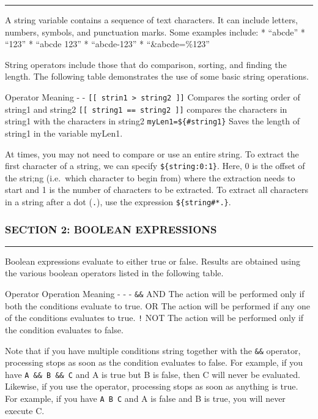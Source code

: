 \begin{center}\rule{3in}{0.4pt}\end{center}

A string variable contains a sequence of text characters. It can include
letters, numbers, symbols, and punctuation marks. Some examples include:
* ``abcde'' * ``123'' * ``abcde 123'' * ``abcde-123'' *
``\&abcde=\%123''

String operators include those that do comparison, sorting, and finding
the length. The following table demonstrates the use of some basic
string operations.

Operator \textbar{} Meaning - \textbar{} -
\texttt{{[}{[} strin1 \textgreater{} string2 {]}{]}} \textbar{} Compares
the sorting order of string1 and string2
\texttt{{[}{[} string1 == string2 {]}{]}} \textbar{} compares the
characters in string1 with the characters in string2
\texttt{myLen1=\$\{\#string1\}} \textbar{} Saves the length of string1
in the variable myLen1.

At times, you may not need to compare or use an entire string. To
extract the first character of a string, we can specify
\texttt{\$\{string:0:1\}}. Here, 0 is the offset of the stri;ng
(i.e.~which character to begin from) where the extraction needs to start
and 1 is the number of characters to be extracted. To extract all
characters in a string after a dot (\texttt{.}), use the expression
\texttt{\$\{string\#*.\}}.

\subsubsection{SECTION 2: BOOLEAN
EXPRESSIONS}\label{section-2-boolean-expressions}

\begin{center}\rule{3in}{0.4pt}\end{center}

Boolean expressions evaluate to either true or false. Results are
obtained using the various boolean operators listed in the following
table.

Operator \textbar{} Operation \textbar{} Meaning - \textbar{} -
\textbar{} - \texttt{\&\&} \textbar{} AND \textbar{} The action will be
performed only if both the conditions evaluate to true.
\textbar{}\textbar{} \textbar{} OR \textbar{} The action will be
performed if any one of the conditions evaluates to true. \texttt{!}
\textbar{} NOT \textbar{} The action will be performed only if the
condition evaluates to false.

Note that if you have multiple conditions string together with the
\texttt{\&\&} operator, processing stops as soon as the condition
evaluates to false. For example, if you have \texttt{A \&\& B \&\& C}
and A is true but B is false, then C will never be evaluated. Likewise,
if you use the \texttt{\textbar{}\textbar{}} operator, processing stops
as soon as anything is true. For example, if you have
\texttt{A \textbar{}\textbar{} B \textbar{}\textbar{} C} and A is false
and B is true, you will never execute C.

